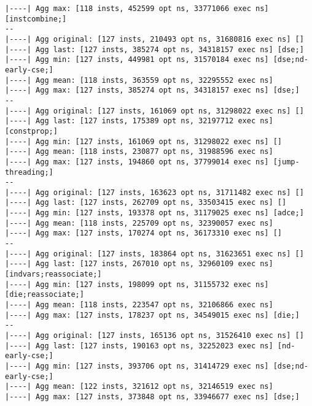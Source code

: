 \documentclass{vldb}
\begin{document}
\begin{lstlisting}[caption={Results of TPC-C Query with No Optimizations},label={lst:tpccnoopt}]
|----| Agg max: [118 insts, 452599 opt ns, 33771066 exec ns] [instcombine;]
--
|----| Agg original: [127 insts, 210493 opt ns, 31680816 exec ns] []
|----| Agg last: [127 insts, 385274 opt ns, 34318157 exec ns] [dse;]
|----| Agg min: [127 insts, 449981 opt ns, 31570184 exec ns] [dse;nd-early-cse;]
|----| Agg mean: [118 insts, 363559 opt ns, 32295552 exec ns]
|----| Agg max: [127 insts, 385274 opt ns, 34318157 exec ns] [dse;]
--
|----| Agg original: [127 insts, 161069 opt ns, 31298022 exec ns] []
|----| Agg last: [127 insts, 175389 opt ns, 32197712 exec ns] [constprop;]
|----| Agg min: [127 insts, 161069 opt ns, 31298022 exec ns] []
|----| Agg mean: [118 insts, 230877 opt ns, 31988596 exec ns]
|----| Agg max: [127 insts, 194860 opt ns, 37799014 exec ns] [jump-threading;]
--
|----| Agg original: [127 insts, 163623 opt ns, 31711482 exec ns] []
|----| Agg last: [127 insts, 262709 opt ns, 33503415 exec ns] []
|----| Agg min: [127 insts, 193378 opt ns, 31179025 exec ns] [adce;]
|----| Agg mean: [118 insts, 225709 opt ns, 32390057 exec ns]
|----| Agg max: [127 insts, 170274 opt ns, 36173310 exec ns] []
--
|----| Agg original: [127 insts, 183864 opt ns, 31623651 exec ns] []
|----| Agg last: [127 insts, 267010 opt ns, 32960109 exec ns] [indvars;reassociate;]
|----| Agg min: [127 insts, 198099 opt ns, 31155732 exec ns] [die;reassociate;]
|----| Agg mean: [118 insts, 223547 opt ns, 32106866 exec ns]
|----| Agg max: [127 insts, 178237 opt ns, 34549015 exec ns] [die;]
--
|----| Agg original: [127 insts, 165136 opt ns, 31526410 exec ns] []
|----| Agg last: [127 insts, 190163 opt ns, 32252023 exec ns] [nd-early-cse;]
|----| Agg min: [127 insts, 393706 opt ns, 31414729 exec ns] [dse;nd-early-cse;]
|----| Agg mean: [122 insts, 321612 opt ns, 32146519 exec ns]
|----| Agg max: [127 insts, 373848 opt ns, 33946677 exec ns] [dse;]
\end{lstlisting}

\clearpage
\end{document}
